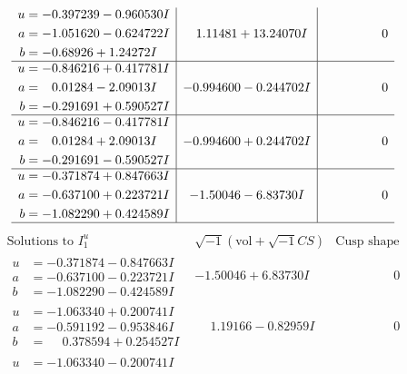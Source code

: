 \documentclass[1p]{elsarticle_modified}
\theoremstyle{definition}
\newcommand{\I}{\sqrt{-1}}
\begin{document}
$$\begin{array}{c|c|c}
\begin{aligned}
u &= -0.397239 - 0.960530 I \\
a &= -1.051620 - 0.624722 I \\
b &= -0.68926 + 1.24272 I\end{aligned}
 & \phantom{-}1.11481 + 13.24070 I & \phantom{-0.000000 } 0 \\ \hline\begin{aligned}
u &= -0.846216 + 0.417781 I \\
a &= \phantom{-}0.01284 - 2.09013 I \\
b &= -0.291691 + 0.590527 I\end{aligned}
 & -0.994600 - 0.244702 I & \phantom{-0.000000 } 0 \\ \hline\begin{aligned}
u &= -0.846216 - 0.417781 I \\
a &= \phantom{-}0.01284 + 2.09013 I \\
b &= -0.291691 - 0.590527 I\end{aligned}
 & -0.994600 + 0.244702 I & \phantom{-0.000000 } 0 \\ \hline\begin{aligned}
u &= -0.371874 + 0.847663 I \\
a &= -0.637100 + 0.223721 I \\
b &= -1.082290 + 0.424589 I\end{aligned}
 & -1.50046 - 6.83730 I & \phantom{-0.000000 } 0\\
 \hline 
 \end{array}$$\newpage$$\begin{array}{c|c|c}  
\text{Solutions to }I^u_{1}& \I (\text{vol} + \sqrt{-1}CS) & \text{Cusp shape}\\
 \hline 
\begin{aligned}
u &= -0.371874 - 0.847663 I \\
a &= -0.637100 - 0.223721 I \\
b &= -1.082290 - 0.424589 I\end{aligned}
 & -1.50046 + 6.83730 I & \phantom{-0.000000 } 0 \\ \hline\begin{aligned}
u &= -1.063340 + 0.200741 I \\
a &= -0.591192 - 0.953846 I \\
b &= \phantom{-}0.378594 + 0.254527 I\end{aligned}
 & \phantom{-}1.19166 - 0.82959 I & \phantom{-0.000000 } 0 \\ \hline\begin{aligned}
u &= -1.063340 - 0.200741 I \\

\end{aligned}
\end{array}$$
\end{document}
